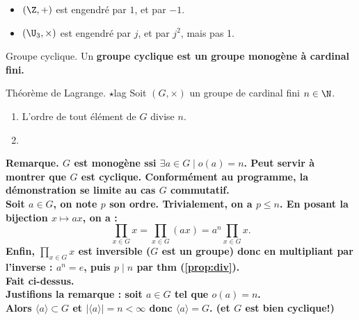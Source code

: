 \documentclass[11pt]{article}
\begin{document}
\vspace*{-0.8cm}

\begin{ex}{}{}
    \begin{itemize}
        \item $(\Z,+)$ est engendré par $1$, et par $-1$.
        \item $(\U_3,\times)$ est engendré par $j$, et par $j^2$, mais pas 1.
    \end{itemize}
\end{ex}

\vspace*{-0.8cm}

\begin{defi}{Groupe cyclique.}{}
    Un \bf{groupe cyclique} est un groupe monogène à cardinal fini.
\end{defi}

\vspace*{-0.8cm}

\begin{thm}{Théorème de Lagrange. $\star$}{lag}
    Soit $(G,\times)$ un groupe de cardinal fini $n\in\N$.
    \begin{enumerate}
        \item L'ordre de tout élément de $G$ divise $n$.
        \vspace{0.1cm}\item {}
    \end{enumerate}
    \bf{Remarque.} $G$ est monogène ssi $\exists a \in G \mid o(a)=n$. Peut servir à montrer que $G$ est cyclique.
    \tcblower
     Conformément au programme, la démonstration se limite au cas $G$ commutatif.\\
    Soit $a\in G$, on note $p$ son ordre. Trivialement, on a $p\leq n$. En posant la bijection $x\mapsto ax$, on a :
    \begin{equation*}
        \prod_{x\in G}x=\prod_{x\in G}(ax)=a^{n}\prod_{x\in G}x.
    \end{equation*}
    Enfin, $\prod_{x\in G}x$ est inversible ($G$ est un groupe) donc en multipliant par l'inverse : $a^{n}=e$, puis $p\mid n$ par thm (\ref{prop:div}).\\
     Fait ci-dessus.\\
    Justifions la remarque : soit $a\in G$ tel que $o(a)=n$.\\
    Alors $\langle a \rangle \subset G$ et $|\langle a\rangle|=n<\infty$ donc $\langle a \rangle = G$. (et $G$ est bien cyclique!)
\end{thm}
\end{document}
